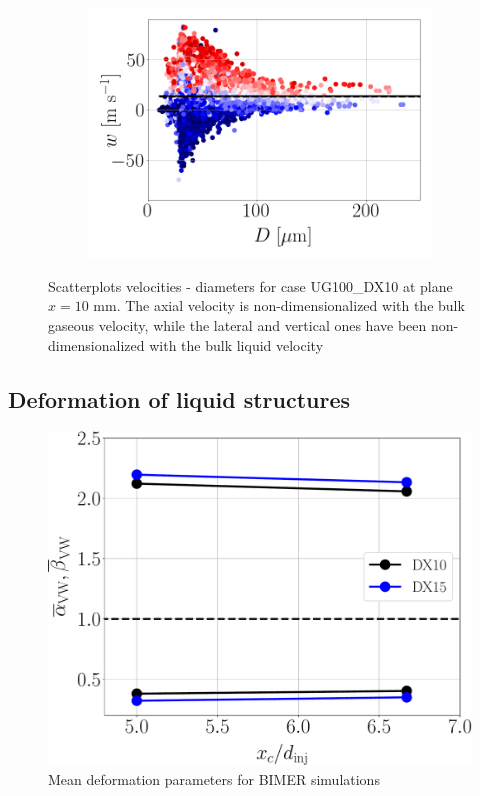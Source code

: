 \begin{figure}[ht]
\begin{subfigure}[b]{0.3\textwidth}
   \includegraphics[scale=0.2]{./part2_developments/figures_ch5_resolved_JICF/SPRAY_characterization/velocities/scatter_uz_D.png}
\end{subfigure}
   \caption[Scatterplots velocities - diameters for case UG100\_DX10 at plane $x = 10$ mm]{Scatterplots velocities - diameters for case UG100\_DX10 at plane $x = 10$ mm. The axial velocity is non-dimensionalized with the bulk gaseous velocity, while the lateral and vertical ones have been non-dimensionalized  with the bulk liquid velocity}
\label{fig:jicf_global_scatterplots}
\end{figure}



\subsection{Deformation of liquid structures}
\label{subsec:ch8_def_liquid_structures}


\begin{figure}[ht]
\centering
   \includegraphics[scale=0.25]{./part3_applications/figures_ch8_resolved/SPRAY_characterization/deformation/deformation_both_alpha_beta_mean}
   \caption{Mean deformation parameters for BIMER simulations}
\label{fig:ch8_jicf_liquid_mean_deformation_with_x_condensed}
\end{figure}


